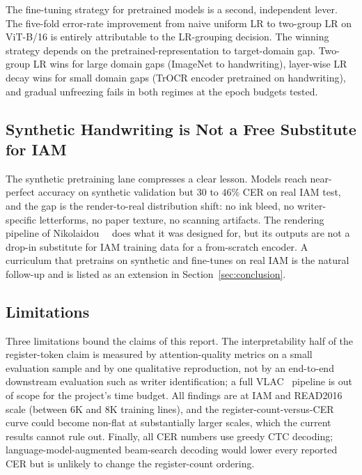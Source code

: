 The fine-tuning strategy for pretrained models is a second, independent lever. The five-fold error-rate improvement from naive uniform LR to two-group LR on ViT-B/16 is entirely attributable to the LR-grouping decision. The winning strategy depends on the pretrained-representation to target-domain gap. Two-group LR wins for large domain gaps (ImageNet to handwriting), layer-wise LR decay wins for small domain gaps (TrOCR encoder pretrained on handwriting), and gradual unfreezing fails in both regimes at the epoch budgets tested.

\subsection{Synthetic Handwriting is Not a Free Substitute for IAM}
\label{sec:disc_synth}

The synthetic pretraining lane compresses a clear lesson. Models reach near-perfect accuracy on synthetic validation but $30$ to $46\%$ CER on real IAM test, and the gap is the render-to-real distribution shift: no ink bleed, no writer-specific letterforms, no paper texture, no scanning artifacts. The rendering pipeline of Nikolaidou~\etal~\cite{nikolaidou2023wordstylist} does what it was designed for, but its outputs are not a drop-in substitute for IAM training data for a from-scratch encoder. A curriculum that pretrains on synthetic and fine-tunes on real IAM is the natural follow-up and is listed as an extension in Section~\ref{sec:conclusion}.

\subsection{Limitations}
\label{sec:disc_limits}

Three limitations bound the claims of this report. The interpretability half of the register-token claim is measured by attention-quality metrics on a small evaluation sample and by one qualitative reproduction, not by an end-to-end downstream evaluation such as writer identification; a full VLAC~\cite{raven2025vlac} pipeline is out of scope for the project's time budget. All findings are at IAM and READ2016 scale (between $6$K and $8$K training lines), and the register-count-versus-CER curve could become non-flat at substantially larger scales, which the current results cannot rule out. Finally, all CER numbers use greedy CTC decoding; language-model-augmented beam-search decoding would lower every reported CER but is unlikely to change the register-count ordering.
